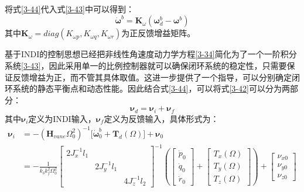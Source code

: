 将式\eqref{3-44}代入式\eqref{3-43}中可以得到：
\begin{equation}
    \dot{\boldsymbol \omega}^b=\boldsymbol{K}_{\omega}(\boldsymbol{\omega}_d^b-\boldsymbol{\omega}^b)
    \label{3-45}
\end{equation}
其中$\boldsymbol{K}_\omega=diag({K}_{\omega p},{K}_{\omega q},{K}_{\omega r})$为正反馈增益矩阵。

基于INDI的控制思想已经把非线性角速度动力学方程\eqref{3-34}简化为了一个一阶积分系统\eqref{3-43}，因此采用单一的比例控制器就可以确保闭环系统的稳定性，只需要保证反馈增益为正，而不管其具体取值。这进一步提供了一个指导，可以分别确定闭环系统的静态平衡点和动态性能。因此结合式\eqref{3-44}，可以将式\eqref{3-42}可以分为两部分：
\begin{equation}
    \boldsymbol{\nu}_d=\boldsymbol{\nu}_i + \boldsymbol{\nu}_f
    \label{3-46}
\end{equation}
其中$\boldsymbol{\nu}_i$定义为INDI输入，$\boldsymbol{\nu}_f$定义为反馈输入，具体形式为：
\begin{equation}
    \begin{aligned}
        \boldsymbol{\nu}_i&=-(\boldsymbol{H}_{vane}\Omega_0^2)^{-1} \big[\boldsymbol{\dot{\omega}}_0^b+\boldsymbol{T}_d(\Omega)\big]+\boldsymbol{\nu}_0\\
        &=-\frac{1}{k_{\delta}k_f^2\Omega_0^2}
        \left[\begin{array}{ccc}2J_x^{-1}l_1 & & \\& 2J_y^{-1}l_1 & \\& & 4J_z^{-1}l_2\end{array}\right]^{-1}
        \left (\begin{bmatrix}\dot{p}_0 \\ \dot{q}_0 \\ \dot{r}_0 \end{bmatrix}+\begin{bmatrix}T_{x}(\Omega) \\ T_{y}(\Omega) \\ T_{z}(\Omega)
        \end{bmatrix}\right )
        +  \begin{bmatrix}\nu_{x0} \\ \nu_{y0} \\ \nu_{z0}\end{bmatrix}
    \end{aligned}
    \label{3-47}
\end{equation}

